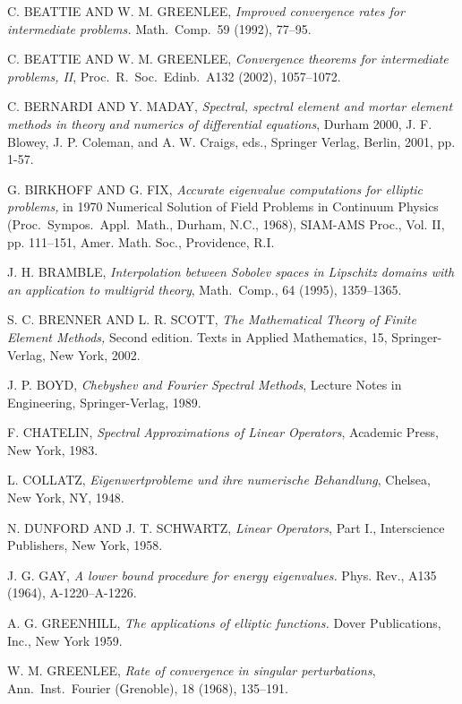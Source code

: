 \documentclass[final]{siamltex}
\numberwithin{equation}{section}
\begin{document}
\begin{thebibliography}{xxx}
 C. BEATTIE AND W. M. GREENLEE, \textit{Improved convergence rates for intermediate problems.} Math.\ Comp.\ 59 (1992), 77--95.

 C. BEATTIE AND W. M. GREENLEE, \textit{Convergence theorems for intermediate problems, II}, Proc.\ R.\ Soc.\ Edinb.\ A132 (2002), 1057--1072.

C. BERNARDI AND Y. MADAY, \textit{Spectral, spectral element and mortar element methods in theory and numerics of differential equations}, Durham 2000, J. F. Blowey, J. P. Coleman, and A. W. Craigs, eds., Springer Verlag, Berlin, 2001, pp. 1-57.

 G. BIRKHOFF AND G. FIX, \textit{Accurate eigenvalue computations for elliptic problems,} in 1970 Numerical Solution of Field Problems in Continuum Physics (Proc.\ Sympos.\ Appl.\ Math., Durham, N.C., 1968), SIAM-AMS Proc., Vol. II, pp. 111--151, Amer. Math. Soc., Providence, R.I.

 J. H. BRAMBLE, \textit{Interpolation between Sobolev spaces in Lipschitz domains with an application to multigrid theory}, Math.\ Comp., 64 (1995), 1359--1365.

 S. C. BRENNER AND L. R. SCOTT, \textit{The Mathematical Theory of Finite Element Methods,} Second edition. Texts in Applied Mathematics, 15, Springer-Verlag, New York, 2002.

 J. P. BOYD, \textit{Chebyshev and Fourier Spectral Methods}, Lecture Notes in Engineering, Springer-Verlag, 1989.

 F. CHATELIN, \textit{Spectral Approximations of Linear Operators}, Academic Press, New York, 1983.

 L. COLLATZ, \textit{Eigenwertprobleme und ihre numerische Behandlung}, Chelsea, New York, NY, 1948.

 N. DUNFORD AND J. T. SCHWARTZ, \textit{Linear Operators}, Part I., Interscience Publishers, New York, 1958.

 J. G. GAY, \textit{A lower bound procedure for energy eigenvalues.} Phys. Rev., A135 (1964), A-1220--A-1226.

 A. G. GREENHILL, \textit{The applications of elliptic functions.} Dover Publications, Inc., New York 1959.

 W. M. GREENLEE, \textit{Rate of convergence in singular perturbations}, Ann.\ Inst.\ Fourier (Grenoble), 18 (1968), 135--191.


\end{thebibliography}
\end{document}
